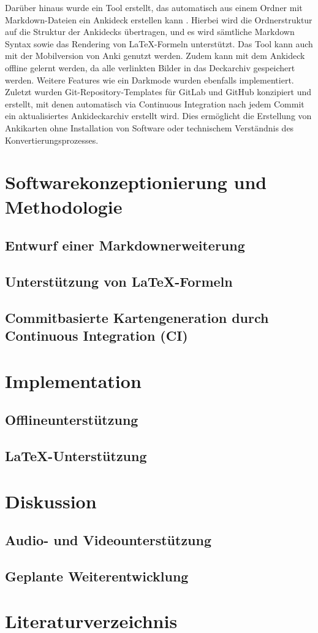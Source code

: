 \documentclass[ngerman]{article}
\begin{document}
Darüber hinaus wurde ein Tool erstellt, das automatisch aus einem Ordner mit Markdown-Dateien ein Ankideck erstellen kann \cite{Ankiding}. Hierbei wird die Ordnerstruktur auf die Struktur der Ankidecks übertragen, und es wird sämtliche Markdown Syntax sowie das Rendering von \LaTeX-Formeln unterstützt. Das Tool kann auch mit der Mobilversion von Anki genutzt werden. Zudem kann mit dem Ankideck offline gelernt werden, da alle verlinkten Bilder in das Deckarchiv gespeichert werden. Weitere Features wie ein Darkmode wurden ebenfalls implementiert.\\

Zuletzt wurden Git-Repository-Templates für GitLab \cite{GitlabTemplate} und GitHub \cite{GithubTemplate} konzipiert und erstellt, mit denen automatisch via Continuous Integration nach jedem Commit ein aktualisiertes Ankideckarchiv erstellt wird. Dies ermöglicht die Erstellung von Ankikarten ohne Installation von Software oder technischem Verständnis des Konvertierungsprozesses.
\section{Softwarekonzeptionierung und Methodologie}
\subsection{Entwurf einer Markdownerweiterung}
\subsection{Unterst\"utzung von \LaTeX-Formeln}
\subsection{Commitbasierte Kartengeneration durch Continuous Integration (CI)}
\section{Implementation}
\subsection{Offlineunterst\"utzung}
\subsection{\LaTeX-Unterst\"utzung}
\section{Diskussion}
\subsection{Audio- und Videounterst\"utzung}
\subsection{Geplante Weiterentwicklung}
\newpage
\section{Literaturverzeichnis}
\printbibliography
\end{document}
